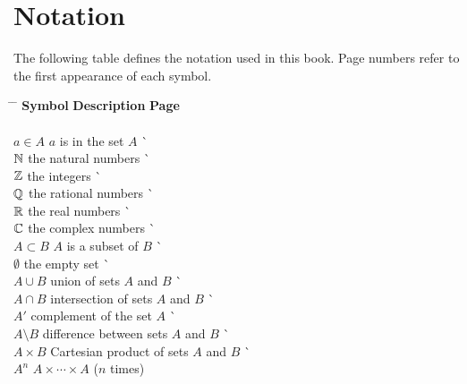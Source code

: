 \chapter*{Notation}
 
\pagestyle{myheadings}
 
The following table defines the  notation used in this book. Page numbers
refer to the first appearance of each symbol.
 
\begin{tabbing}
\hspace{1.5in} \= \hspace{2.5in} \= \kill
{\bf Symbol}  \> {\bf Description} \>  \` {\bf Page} \\ 
     \mbox{\hspace*{1in}} \\
$a \in A$ \> $a$ is in the set $A$ \> \` \pageref{setmembership} \\
${\Bbb N}$ \> the natural numbers \> \` \pageref{naturalnum} \\
${\Bbb Z}$ \> the integers \> \` \pageref{integers} \\
${\Bbb Q}$ \> the rational numbers \> \` \pageref{rationals} \\
${\Bbb R}$ \> the real numbers \> \` \pageref{reals} \\
${\Bbb C}$ \> the complex numbers \> \` \pageref{complexnum} \\
$A \subset B$ \> $A$ is a subset of $B$ \> \` \pageref{setcontain} \\
$\emptyset$ \> the empty set \> \` \pageref{theemptyset} \\
$A \cup B$ \> union of sets $A$ and $B$ \> \` \pageref{union} \\
$A \cap B$ \> intersection of sets $A$ and $B$ \> 
     \` \pageref{intersection} \\
$A'$ \> complement of the  set $A$	 \> \` \pageref{setcomplement} \\
$A \setminus B$ \> difference between sets $A$ and $B$ \>
     \` \pageref{setdifference} \\
$A \times B$ \> Cartesian product of sets $A$ and $B$ \>
     \` \pageref{cartesian} \\
$A^n$ \> $A \times \cdots \times A$ ($n$ times) \> 

\end{tabbing}
